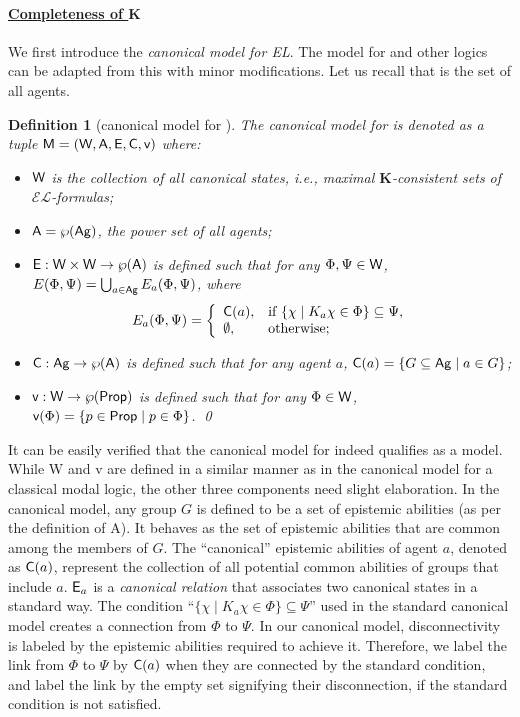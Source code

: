 \documentclass{article}
\newtheorem{definition}[theorem]{Definition}%
\newcommand{\ag}{\text{\normalfont\textsf{Ag}}\xspace}
\newcommand{\CA}{\textnormal{\sf A}\xspace}
\newcommand{\CC}{\textnormal{\sf C}\xspace}
\newcommand{\CE}{\textnormal{\sf E}\xspace}
\newcommand{\CM}{\textnormal{\sf M}\xspace}
\newcommand{\CV}{\textnormal{\sf v}\xspace}
\newcommand{\CW}{\textnormal{\sf W}\xspace}
\newcommand{\prop}{\text{\normalfont\textsf{Prop}}\xspace}
\newcommand{\lang}{\ensuremath{\mathcal{EL}}\xspace}
\renewcommand{\l}{\text{\normalfont EL}\xspace}
\newcommand{\ls}{\text{\normalfont EL$^s$}\xspace}
\newcommand{\K}{\ensuremath{\mathbf{K}}\xspace}
\begin{document}
\paragraph{\underline{Completeness of \K}}

We first introduce the \emph{canonical model for EL}. The model for \ls and other logics can be adapted from this with minor modifications. Let us recall that \ag is the set of all agents.

\begin{definition}[canonical model for \l]\label{def:cm-el}
The canonical model for \l is denoted as a tuple $\CM = (\CW, \CA, \CE, \CC, \CV )$ where:
\begin{itemize}
\item $\CW$ is the collection of all \emph{canonical states}, i.e., maximal \K-consistent sets of \lang-formulas;
%
\item $\CA=\wp(\ag)$, the power set of all agents;
%
\item $\CE : \CW \times \CW \to \wp(\CA)$ is defined such that for any $\Phi,\Psi \in \CW$, $E (\Phi,\Psi) = \bigcup_{a\in \ag} E_a(\Phi,\Psi)$, where $$E_a(\Phi,\Psi) = \left\{\begin{array}{ll}
	\CC(a), & \text{if $\{\chi\mid K_a\chi\in\Phi\}\subseteq\Psi$},\\
	\emptyset, & \text{otherwise;}
\end{array}\right.$$
%
\item $\CC : \ag \to \wp(\CA)$ is defined such that for any agent $a$, $\CC(a)=\{G \subseteq \ag \mid a\in G \}$;
%
\item $\CV: \CW \to \wp(\prop)$ is defined such that for any $\Phi \in \CW$, $\CV (\Phi) = \{ p \in \prop \mid p \in \Phi \}$.
\qed
\end{itemize}
\end{definition}

It can be easily verified that the canonical model for \l indeed qualifies as a model. While \CW and \CV are defined in a similar manner as in the canonical model for a classical modal logic, the other three components need slight elaboration. In the canonical model, any group $G$ is defined to be a set of epistemic abilities (as per the definition of \CA). It behaves as the set of epistemic abilities that are common among the members of $G$. The ``canonical'' epistemic abilities of agent $a$, denoted as $\CC(a)$, represent the collection of all potential common abilities of groups that include $a$. $\CE_a$ is a \emph{canonical relation} that associates two canonical states in a standard way. The condition ``$\{\chi\mid K_a\chi\in\Phi\}\subseteq\Psi$'' used in the standard canonical model creates a connection from $\Phi$ to $\Psi$. In our canonical model, disconnectivity is labeled by the epistemic abilities required to achieve it. Therefore, we label the link from $\Phi$ to $\Psi$ by $\CC(a)$ when they are connected by the standard condition, and label the link by the empty set signifying their disconnection, if the standard condition is not satisfied.
\end{document}
